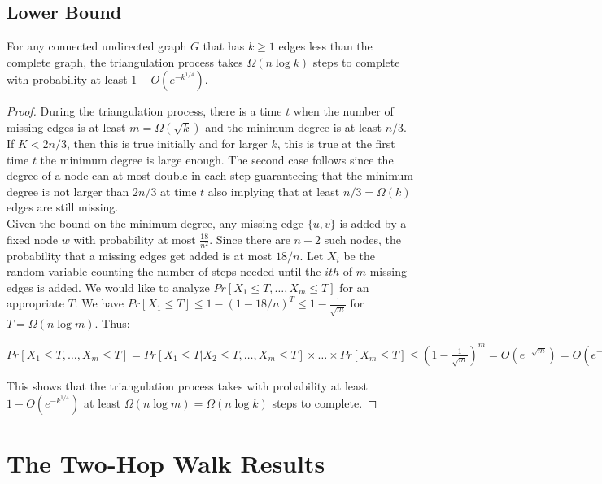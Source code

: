 \documentclass[
10pt, %
a4paper, %
oneside, %
headinclude,footinclude, %
BCOR5mm, %
]{scrartcl}
\begin{document}
\subsection{Lower Bound}
\begin{theorem}\label{thm:9}
	For any connected undirected graph $G$ that has $k \geq 1$ edges less than the complete graph, the triangulation process takes $\Omega(n\log k)$ steps to complete with probability at least $1 - O(e^{-k^{1/4}})$.
\end{theorem}
\begin{proof}
	During the triangulation process, there is a time $t$ when the number of missing edges is at least $m = \Omega(\sqrt{k})$ and the minimum degree is at least $n/3$. If $K < 2n/3$, then this is true initially and for larger $k$, this is true at the first time $t$ the minimum degree is large enough. The second case follows since the degree of a node can at most double in each step guaranteeing that the minimum degree is not larger than $2n/3$ at time $t$ also implying that at least $n/3 = \Omega(k)$ edges are still missing.\\
	Given the bound on the minimum degree, any missing edge $\{u,v\}$ is added by a fixed node $w$ with probability at most $\frac{18}{n^2}$. Since there are $n-2$ such nodes, the probability that a missing edges get added is at most $18/n$. Let $X_i$ be the random variable counting the number of steps needed until the $ith$ of  $m$ missing edges is added. We would like to analyze $Pr[X_1 \leq T, \ldots, X_m \leq T]$ for an appropriate $T$. We have $Pr[X_1 \leq T] \leq 1 - (1 - 18/n)^T \leq 1 - \frac{1}{\sqrt{m}}$ for $ T = \Omega(n\log m)$. Thus:
	\begin{center}
		\begin{math}
		Pr[X_1 \leq T, \ldots, X_m \leq T] = Pr[X_1 \leq T | X_2 \leq T, \ldots, X_m \leq T]\times \ldots \times Pr[X_m \leq T] \leq (1 - \frac{1}{\sqrt{m}})^ m = O(e^{-\sqrt{m}}) = O(e^{-k^{1/4}}).
		\end{math}
	\end{center}
	This shows that the triangulation process takes with probability at least $1 - O(e^{-k^{1/4}})$ at least $\Omega(n \log m) = \Omega(n \log k)$ steps to complete.
\end{proof}

\section{The Two-Hop Walk Results}
\end{document}
